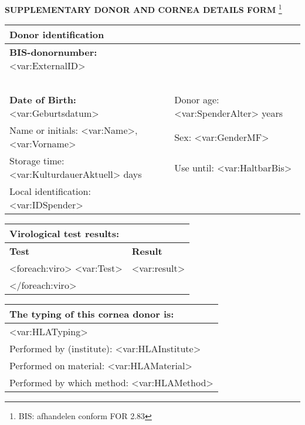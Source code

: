 \documentclass[12pt]{scrartcl}
\begin{document}
{\bfseries
SUPPLEMENTARY DONOR AND CORNEA DETAILS FORM} \footnote{BIS: afhandelen conform FOR 2.83}\\


\hspace*{-5.5mm} \begin{tabular}{|p{10cm}p{5cm}|}
\hline
{\bfseries Donor identification} \\\hline

{\bfseries BIS-donornumber: }<var:ExternalID>&~ \\~&\\ 
{\bfseries Date of Birth:}  <var:Geburtsdatum> & { Donor age: <var:SpenderAlter> years}\\
{ Name or initials: <var:Name>,  <var:Vorname>} & Sex: <var:GenderMF>\\

{ Storage time: <var:KulturdauerAktuell> days} &{ Use until: <var:HaltbarBis>}\\
\hline

Local identification: <var:IDSpender>
\\\hline
\end{tabular}


\begin{longtable}[l]{|p{2.631cm}|p{3.61cm}|}
\hline
\multicolumn{2}{p{15.287cm}|}{{\bfseries
Virological test results:}
}\\\hline
{\bfseries
Test}
&
{\bfseries
Result}
\\\hline
<foreach:viro>
<var:Test>
&
<var:result>
\\\hline
</foreach:viro>
\end{longtable}

\begin{longtable}[l]{|p{15.287001cm}}
\hline
{\bfseries
The typing of this cornea donor is:}
\\\hline

<var:HLATyping>
\\\hline
{
Performed by (institute):} <var:HLAInstitute>
\\\hline
{
Performed on material:} <var:HLAMaterial>
\\\hline
{
Performed by which method:} <var:HLAMethod>
\\\hline
\end{longtable}
\end{document}
